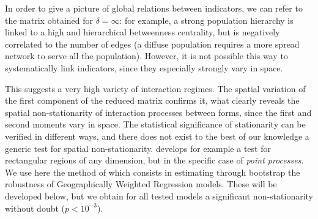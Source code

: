 In order to give a picture of global relations between indicators, we can refer to the matrix obtained for $\delta = \infty$: for example, a strong population hierarchy is linked to a high and hierarchical betweenness centrality, but is negatively correlated to the number of edges (a diffuse population requires a more spread network to serve all the population). However, it is not possible this way to systematically link indicators, since they especially strongly vary in space. 



This suggests a very high variety of interaction regimes. The spatial variation of the first component of the reduced matrix confirms it, what clearly reveals the spatial non-stationarity of interaction processes between forms, since the first and second moments vary in space. The statistical significance of stationarity can be verified in different ways, and there does not exist to the best of our knowledge a generic test for spatial non-stationarity. \cite{zhang2014test} develops for example a test for rectangular regions of any dimension, but in the specific case of \emph{point processes}. We use here the method of \cite{leung2000statistical} which consists in estimating through bootstrap the robustness of Geographically Weighted Regression models. These will be developed below, but we obtain for all tested models a significant non-stationarity without doubt ($p<10^{-3}$).



